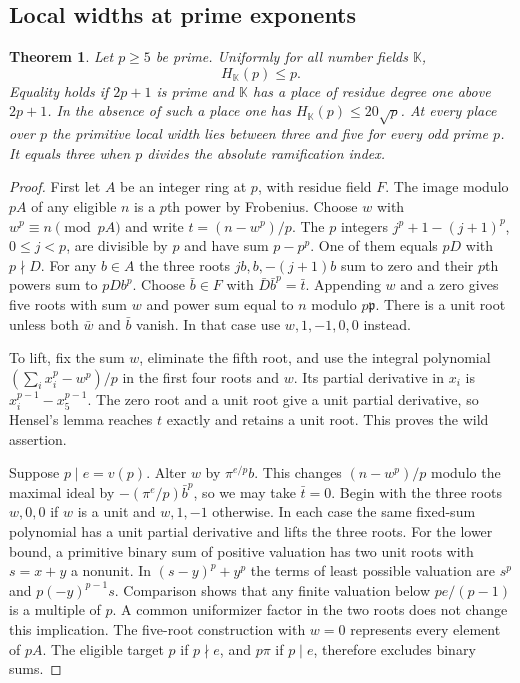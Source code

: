 \documentclass[11pt,letterpaper]{article}
\newtheorem{theorem}{Theorem}[section]
\theoremstyle{definition}
\numberwithin{equation}{section}
\begin{document}
\subsection{Local widths at prime exponents}\label{sec:prime-degree-width}
\begin{theorem}\label{thm:prime-degree-width}
Let $p\ge5$ be prime. Uniformly for all number fields $\mathbb K$,
\[
 H_{\mathbb K}(p)\le p.
\]
Equality holds if $2p+1$ is prime and $\mathbb K$ has a place of residue degree one above $2p+1$. In the absence of such a place one has
$H_{\mathbb K}(p)\le20\sqrt p$. At every place over $p$ the primitive
local width lies between three and five for every odd prime $p$.
It equals three when $p$ divides the absolute ramification index.
\end{theorem}
\begin{proof}
First let $A$ be an integer ring at $p$, with residue field $F$.
The image modulo $pA$ of any eligible $n$ is a $p$th power by
Frobenius. Choose $w$ with $w^p\equiv n\pmod{pA}$ and write
$t=(n-w^p)/p$. The $p$ integers $j^p+1-(j+1)^p$, $0\le j<p$,
are divisible by $p$ and have sum $p-p^p$. One of them equals
$pD$ with $p\nmid D$. For any $b\in A$ the three roots
$jb,b,-(j+1)b$ sum to zero and their $p$th powers sum to $pDb^p$.
Choose $\bar b\in F$ with $\bar D\bar b^p=\bar t$. Appending $w$
and a zero gives five roots with sum $w$ and power sum equal to $n$
modulo $p\mathfrak p$. There is a unit root unless both $\bar w$
and $\bar b$ vanish. In that case use $w,1,-1,0,0$ instead.

To lift, fix the sum $w$, eliminate the fifth root, and use the
integral polynomial $(\sum_i x_i^p-w^p)/p$ in the first four
roots and $w$. Its partial derivative in $x_i$ is
$x_i^{p-1}-x_5^{p-1}$. The zero root and a unit root give a
unit partial derivative, so Hensel's lemma reaches $t$ exactly
and retains a unit root. This proves the wild assertion.

Suppose $p\mid e=v(p)$. Alter $w$ by $\pi^{e/p}b$. This changes
$(n-w^p)/p$ modulo the maximal ideal by $-(\pi^e/p)\bar b^p$,
so we may take $\bar t=0$. Begin with the three roots $w,0,0$
if $w$ is a unit and $w,1,-1$ otherwise. In each case the same
fixed-sum polynomial has a unit partial derivative and lifts the
three roots. For the lower bound, a primitive binary sum of
positive valuation has two unit roots with $s=x+y$ a nonunit.
In $(s-y)^p+y^p$ the terms of least possible valuation are
$s^p$ and $p(-y)^{p-1}s$. Comparison shows that any finite
valuation below $pe/(p-1)$ is a multiple of $p$. A common uniformizer
factor in the two roots does not change this implication. The
five-root construction with $w=0$ represents every element of $pA$.
The eligible target $p$ if $p\nmid e$, and $p\pi$ if $p\mid e$,
therefore excludes binary sums.


\end{proof}
\end{document}
